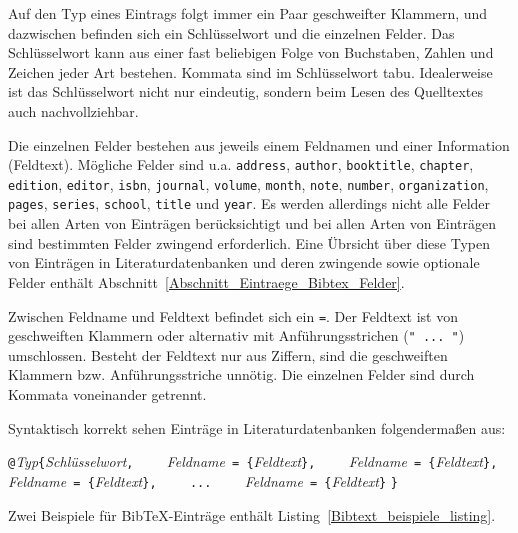 Auf den Typ eines Eintrags folgt immer ein Paar 
geschweifter Klammern, und dazwischen befinden sich ein Schlüsselwort und 
die einzelnen Felder.
Das Schlüsselwort kann aus einer fast beliebigen
Folge von Buchstaben, 
Zahlen und Zeichen jeder Art bestehen. 
Kommata sind im Schlüsselwort tabu. 
Idealerweise ist das Schlüsselwort nicht nur eindeutig, sondern beim Lesen des Quelltextes auch nachvollziehbar.

Die einzelnen Felder bestehen 
aus jeweils einem Feldnamen
und einer Information (Feldtext).
Mögliche Felder sind u.a. \texttt{address}, \texttt{author}, \texttt{booktitle}, \texttt{chapter}, \texttt{edition}, \texttt{editor}, \texttt{isbn}, \texttt{journal}, \texttt{volume}, \texttt{month}, \texttt{note}, \texttt{number}, \texttt{organization}, \texttt{pages}, \texttt{series}, \texttt{school}, \texttt{title} und \texttt{year}. Es werden allerdings nicht alle Felder bei allen Arten von Einträgen berücksichtigt und bei allen Arten von Einträgen sind bestimmten Felder zwingend erforderlich. Eine Übrsicht über diese Typen von Einträgen in Literaturdatenbanken und deren zwingende sowie optionale Felder enthält Abschnitt~\ref{Abschnitt_Eintraege_Bibtex_Felder}.

Zwischen Feldname und Feldtext befindet sich ein \verb!=!. Der Feldtext ist von geschweiften Klammern oder alternativ mit Anführungsstrichen (\verb!" ... "!) umschlossen. Besteht der Feldtext nur aus Ziffern, sind die geschweiften Klammern bzw. Anführungsstriche unnötig.
Die einzelnen Felder sind durch Kommata voneinander getrennt.

Syntaktisch korrekt sehen Einträge in Literaturdatenbanken folgendermaßen aus: 

\begin{boxedminipage}{\textwidth}
\verb!@!\textsl{Typ}\verb!{!\textsl{Schlüsselwort}\verb!,!\newline
\verb!    !\textsl{Feldname}\verb! = {!\textsl{Feldtext}\verb!},! \newline
\verb!    !\textsl{Feldname}\verb! = {!\textsl{Feldtext}\verb!},! \newline
\verb!    !\textsl{Feldname}\verb! = {!\textsl{Feldtext}\verb!},! \newline
\verb!    !\verb!...! \newline
\verb!    !\textsl{Feldname}\verb! = {!\textsl{Feldtext}\verb!}! \newline
\verb!}!
\end{boxedminipage}

Zwei Beispiele für Bib\TeX-Einträge enthält Listing~\ref{Bibtext_beispiele_listing}.

